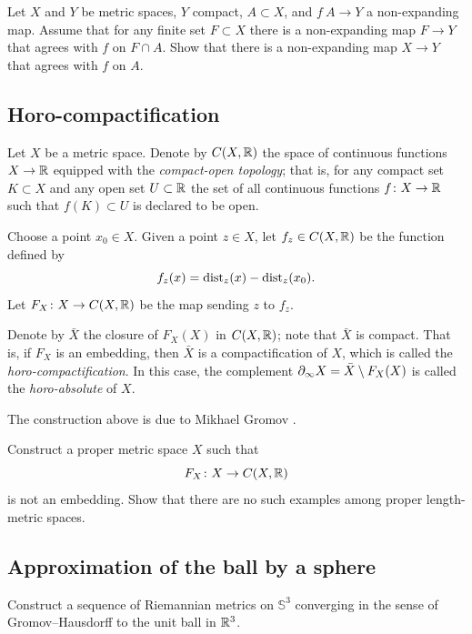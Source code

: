 \begin{pr}
Let $X$ and $Y$ be metric spaces, $Y$ compact, $A\subset X$, and $f\:A\to Y$ a non-expanding map.
Assume that for any finite set $F\subset X$ there is a non-expanding map $F \to Y$ that agrees with $f$ on $F\cap A$.
Show that there is a non-expanding map $X\to Y$ that agrees with $f$ on $A$.
\end{pr}

\subsection*{Horo-compactification\easy}
\label{Horocompactification}

Let $X$ be a metric space.
Denote by $C(X,\mathbb{R})$ the space of continuous functions $X\to \mathbb{R}$ equipped with the \emph{compact-open topology};
that is, for any compact set $K\subset X$ and any open set $U\subset \mathbb{R}$ the set of all continuous functions $f\colon X\to \mathbb{R}$ such that $f(K)\subset U$ is declared to be open.

Choose a point $x_0\in X$.
Given a point $z\in X$, let $f_z\in C(X,\mathbb{R})$ be the function defined by 
\[f_z(x)=\operatorname{\rm dist}\nolimits_z(x)-\operatorname{\rm dist}\nolimits_z(x_0).\]
Let $F_X\colon X\to C(X,\mathbb{R})$ be the map sending $z$ to $f_z$.


Denote by $\bar X$ the closure of $F_X(X)$ in $C(X,\mathbb{R})$;
note that $\bar X$ is compact.
That is, if $F_X$ is an embedding, then $\bar X$ is a compactification of $X$, which is called the \emph{horo-compactification}.
In this case, the complement $\partial_\infty X\z=\bar X\setminus F_X(X)$ is called the {}\emph{horo-absolute} of $X$.

The construction above is due to Mikhael Gromov \cite{gromov-hyperbolic}.

\begin{pr}
Construct a proper metric space $X$ such that
\[F_X\colon X \to C(X,\mathbb{R})\] 
is not an embedding.
Show that there are no such examples among proper length-metric spaces.
\end{pr}

\subsection*{Approximation of the ball by a sphere}
\label{3-sphere is close to a ball}

\begin{pr}
Construct a sequence of Riemannian metrics on $\mathbb{S}^3$ converging in the sense of Gromov--Hausdorff to the unit ball in $\mathbb{R}^3$.
\end{pr}

